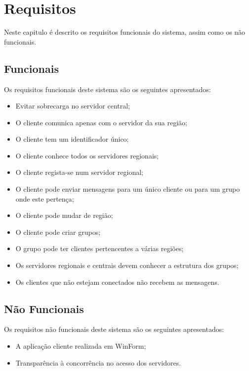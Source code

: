 \chapter{Requisitos}
Neste capitulo é descrito os requisitos funcionais do sistema, assim como os não funcionais.
\section{Funcionais}
Os requisitos funcionais deste sistema são os seguintes apresentados:
\begin{itemize}
	\item Evitar sobrecarga no servidor central;
	\item O cliente comunica apenas com o servidor da sua região;
	\item O cliente tem um identificador único;
	\item O cliente conhece todos os servidores regionais;
	\item O cliente regista-se num servidor regional;
	\item O cliente pode enviar mensagens para um único cliente ou para um grupo onde este pertença;
	\item O cliente pode mudar de região;
	\item O cliente pode criar grupos;
	\item O grupo pode ter clientes pertencentes a várias regiões;
	\item Os servidores regionais e centrais devem conhecer a estrutura dos grupos;
	\item Os clientes que não estejam conectados não recebem as mensagens.
\end{itemize}
\section{Não Funcionais}
Os requisitos não funcionais deste sistema são os seguintes apresentados:
\begin{itemize}
	\item A aplicação cliente realizada em WinForm;
	\item Transparência à concorrência no acesso dos servidores.
\end{itemize}